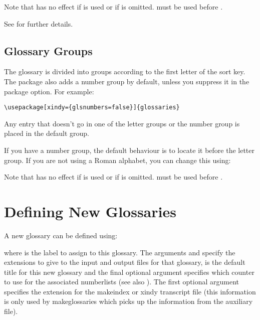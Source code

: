 \documentclass{nlctdoc}
\begin{document}
\begin{important}
Note that  has no effect if 
is used or if  is omitted.
 must be used before 
.
\end{important}

See  for further details.


\subsection{Glossary Groups}

The glossary is divided into groups according to the first
letter of the sort key. The  package also adds
a number group by default, unless you suppress it in the
 package option. For example:
\begin{verbatim}
\usepackage[xindy={glsnumbers=false}]{glossaries}
\end{verbatim}
Any entry that doesn't go in one of the letter groups or the
number group is placed in the default group.

If you have a number group, the default behaviour is to locate
it before the  letter group. If you are not using a
Roman alphabet, you can change this using:

\DescribeMacro{\GlsSetXdyFirstLetterAfterDigits}
\begin{definition}
\end{definition}

\begin{important}\raggedright
Note that  has no effect if 
 is used or if  is omitted.
 must be used before 
.\par
\end{important}


\section{Defining New Glossaries}
\label{sec:newglossary}

A new glossary can be defined using:
\begin{definition}[\DescribeMacro{\newglossary}]
\end{definition}
where  is the label to assign to this glossary. The
arguments  and  specify the extensions to
give to the input and output files for that glossary, 
is the default title for this new glossary and the final optional
argument  specifies which counter to use for the
associated \glspl{numberlist} (see also
). The first optional argument specifies
the extension for the \gls{makeindex} or \gls{xindy} transcript file
(this information is only used by \gls{makeglossaries} which picks
up the information from the auxiliary file).
\end{document}
